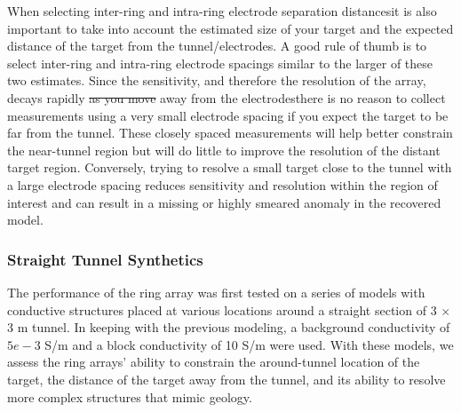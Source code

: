\documentclass[preprint,authoryear,12pt]{elsarticle}
\providecommand{\DIFaddtex}[1]{{\protect\color{blue}\uwave{#1}}} %
\providecommand{\DIFdeltex}[1]{{\protect\color{red}\sout{#1}}}                      %
\providecommand{\DIFaddbegin}{} %
\providecommand{\DIFaddend}{} %
\providecommand{\DIFdelbegin}{} %
\providecommand{\DIFdelend}{} %
\providecommand{\DIFadd}[1]{\texorpdfstring{\DIFaddtex{#1}}{#1}} %
\providecommand{\DIFdel}[1]{\texorpdfstring{\DIFdeltex{#1}}{}} %
\begin{document}
When selecting inter-ring and intra-ring electrode separation distances\DIFaddbegin \DIFadd{, }\DIFaddend it is also important to take into account the estimated size of your target and the expected distance of the target from the tunnel/electrodes. A good rule of thumb is to select inter-ring and intra-ring electrode spacings similar to the larger of these two estimates. Since the sensitivity, and therefore the resolution of the array, decays rapidly \DIFdelbegin \DIFdel{as you move }\DIFdelend away from the electrodes\DIFaddbegin \DIFadd{, }\DIFaddend there is no reason to collect measurements using a very small electrode spacing if you expect the target to be far from the tunnel. These closely spaced measurements will help better constrain the near-tunnel region but will do little to improve the resolution of the distant target region. Conversely, trying to resolve a small target close to the tunnel with a large electrode spacing reduces sensitivity and resolution within the region of interest and can result in a missing or highly smeared anomaly in the recovered model.


\DIFdelbegin %


\DIFdelend \subsubsection{Straight Tunnel Synthetics}
\label{sec:RingArray_Development_Straight_Synth_Intro}
The performance of the ring array was first tested on a series of models with conductive structures placed at various locations around a straight section of 3 $\times$ 3 m tunnel. In keeping with the previous modeling, a background conductivity of \DIFdelbegin \DIFdel{$5e-3$ }\DIFdelend \DIFaddbegin \DIFadd{$5 \times 10^{\text{-3}}$ }\DIFaddend S/m and a block conductivity of 10 S/m were used. With these models, we assess the ring arrays' ability to constrain the around-tunnel location of the target, the distance of the target away from the tunnel, and its ability to resolve more complex structures that mimic geology.
\end{document}
